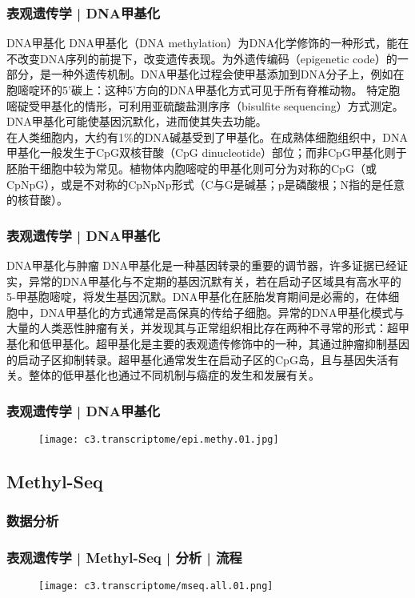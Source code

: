 \begin{frame}
  \frametitle{表观遗传学 | DNA甲基化}
  \begin{block}{DNA甲基化}
    DNA甲基化（DNA methylation）为DNA化学修饰的一种形式，能在不改变DNA序列的前提下，改变遗传表现。为外遗传编码（epigenetic code）的一部分，是一种外遗传机制。DNA甲基化过程会使甲基添加到DNA分子上，例如在胞嘧啶环的5'碳上：这种5'方向的DNA甲基化方式可见于所有脊椎动物。 特定胞嘧碇受甲基化的情形，可利用亚硫酸盐测序序（bisulfite sequencing）方式测定。DNA甲基化可能使基因沉默化，进而使其失去功能。\\
\vspace{1em}
    在人类细胞内，大约有1\%的DNA碱基受到了甲基化。在成熟体细胞组织中，DNA甲基化一般发生于CpG双核苷酸（CpG dinucleotide）部位；而非CpG甲基化则于胚胎干细胞中较为常见。植物体内胞嘧啶的甲基化则可分为对称的CpG（或CpNpG），或是不对称的CpNpNp形式（C与G是碱基；p是磷酸根；N指的是任意的核苷酸）。
  \end{block}
\end{frame}

\begin{frame}
  \frametitle{表观遗传学 | DNA甲基化}
  \begin{block}{DNA甲基化与肿瘤}
 DNA甲基化是一种基因转录的重要的调节器，许多证据已经证实，异常的DNA甲基化与不定期的基因沉默有关，若在启动子区域具有高水平的5-甲基胞嘧啶，将发生基因沉默。DNA甲基化在胚胎发育期间是必需的，在体细胞中，DNA甲基化的方式通常是高保真的传给子细胞。异常的DNA甲基化模式与大量的人类恶性肿瘤有关，并发现其与正常组织相比存在两种不寻常的形式：超甲基化和低甲基化。超甲基化是主要的表观遗传修饰中的一种，其通过肿瘤抑制基因的启动子区抑制转录。超甲基化通常发生在启动子区的CpG岛，且与基因失活有关。整体的低甲基化也通过不同机制与癌症的发生和发展有关。 
  \end{block}
\end{frame}

\begin{frame}
  \frametitle{表观遗传学 | DNA甲基化}
  \begin{figure}
    \centering
    \texttt{[image: c3.transcriptome/epi.methy.01.jpg]}
  \end{figure}
\end{frame}

\subsection{Methyl-Seq}
\subsubsection{数据分析}
\begin{frame}
  \frametitle{表观遗传学 | Methyl-Seq | 分析 | 流程}
  \begin{figure}
    \centering
    \texttt{[image: c3.transcriptome/mseq.all.01.png]}
  \end{figure}
\end{frame}

